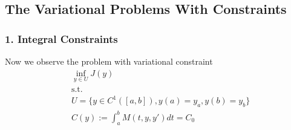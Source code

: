 \subsection{The Variational Problems With Constraints}
\subsubsection{1. Integral Constraints}
Now we observe the problem with variational constraint
\begin{equation}\tag{(P3)}\label{prob:P3}
\begin{aligned}
	& \inf_{y \in U} J(y)\\
	& \text{s.t.}\\
	& U = \{ y \in C^1([a, b]), y(a) = y_a, y(b) = y_b \}\\
	& C(y) := \int_a^b M(t, y, y') dt = C_0
\end{aligned}
\end{equation}

